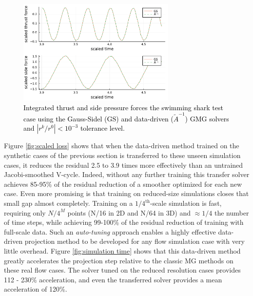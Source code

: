 \documentclass[]{elsarticle}
\begin{document}
\begin{figure}
    \centering
    \includegraphics[width=0.7\textwidth]{figures/forces.pdf}
    \caption{\textcolor{black}{Integrated thrust and side pressure forces the swimming shark test case using the Gauss-Sidel (GS) and data-driven ($\tilde A^{-1}$) GMG solvers and $|r^k/r^0|<10^{-3}$ tolerance level.}}
    \label{fig:simulation forces}
\end{figure}

Figure \ref{fig:scaled loss} shows that when the data-driven method trained on the synthetic cases of the previous section is transferred to these unseen simulation cases, it reduces the residual 2.5 to 3.9 times more effectively than an untrained Jacobi-smoothed V-cycle. Indeed, without any further training this transfer solver achieves 85-95\% of the residual reduction of a smoother optimized for each new case. Even more promising is that training on reduced-size simulations closes that small gap almost completely. Training on a $1/4^\text{th}$-scale simulation is fast, requiring only $N/4^M$ points (N/16 in 2D and N/64 in 3D) and $\approx 1/4$ the number of time steps, while achieving 99-100\% of the residual reduction of training with full-scale data. Such an \textit{auto-tuning} approach enables a highly effective data-driven projection method to be developed for any flow simulation case with very little overhead. Figure \ref{fig:simulation time} shows that this data-driven method greatly accelerates the projection step relative to the classic MG methods on these real flow cases. The solver tuned on the reduced resolution cases provides 112 - 230\% acceleration, and even the transferred solver provides a mean acceleration of 120\%. 
\end{document}
